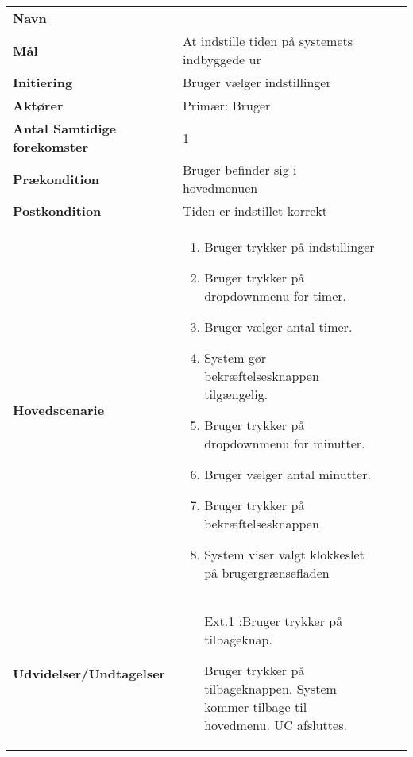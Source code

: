 \begin{longtable}{>{\bfseries}TX TX}
	Navn & \bfseries{} \\
		Mål & At indstille tiden på systemets indbyggede ur\\
	Initiering & Bruger vælger indstillinger \\
	Aktører & Primær: Bruger \\
	Antal Samtidige forekomster & 1 \\
	Prækondition & Bruger befinder sig i hovedmenuen \\
	Postkondition & Tiden er indstillet korrekt \\
	Hovedscenarie & \begin{enumerate}
		\item Bruger trykker på indstillinger
		\item Bruger trykker på dropdownmenu for timer.
		\item Bruger vælger antal timer.
		\item System gør bekræftelsesknappen tilgængelig.
		\item Bruger trykker på dropdownmenu for minutter.
		\item Bruger vælger antal minutter.
		\item Bruger trykker på bekræftelsesknappen 
		\item System viser valgt klokkeslet på brugergrænsefladen
		
	\end{enumerate} \\
	Udvidelser/Undtagelser & 
	\begin{enumerate}{}{}
	\item[Ext.1]:Bruger trykker på tilbageknap.
	
		\subitem[1.1] Bruger trykker på tilbageknappen.
		\subitem[1.2] System kommer tilbage til hovedmenu.	 
		\subitem[1.3]UC afsluttes. \newline 
	\end{enumerate}
\end{longtable}